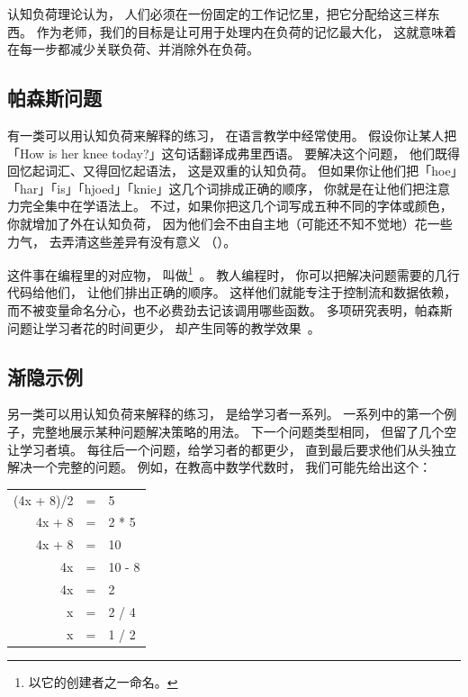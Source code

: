 认知负荷理论认为，
人们必须在一份固定的工作记忆里，把它分配给这三样东西。
作为老师，我们的目标是让可用于处理内在负荷的记忆最大化，
这就意味着在每一步都减少关联负荷、并消除外在负荷。

\subsection*{帕森斯问题}

有一类可以用认知负荷来解释的练习，
在语言教学中经常使用。
假设你让某人把「How is her knee today?」这句话翻译成弗里西语。
要解决这个问题，
他们既得回忆起词汇、又得回忆起语法，
这是双重的认知负荷。
但如果你让他们把「hoe」「har」「is」「hjoed」「knie」这几个词排成正确的顺序，
你就是在让他们把注意力完全集中在学语法上。
不过，如果你把这几个词写成五种不同的字体或颜色，
你就增加了外在认知负荷，
因为他们会不由自主地（可能还不知不觉地）花一些力气，
去弄清这些差异有没有意义
（）。


这件事在编程里的对应物，
叫做\footnote{以它的创建者之一命名。}~\cite{Pars2006}。
教人编程时，
你可以把解决问题需要的几行代码给他们，
让他们排出正确的顺序。
这样他们就能专注于控制流和数据依赖，
而不被变量命名分心，也不必费劲去记该调用哪些函数。
多项研究表明，帕森斯问题让学习者花的时间更少，
却产生同等的教学效果~\cite{Eric2017}。

\subsection*{渐隐示例}

另一类可以用认知负荷来解释的练习，
是给学习者一系列。
一系列中的第一个例子，完整地展示某种问题解决策略的用法。
下一个问题类型相同，
但留了几个空让学习者填。
每往后一个问题，给学习者的都更少，
直到最后要求他们从头独立解决一个完整的问题。
例如，在教高中数学代数时，
我们可能先给出这个：

\begin{center}
\begin{tabular}{rcl}
  (4x + 8)/2	& = &	5	\\
  4x + 8	& = &	2 * 5	\\
  4x + 8	& = &	10	\\
  4x		& = &	10 - 8	\\
  4x		& = &	2	\\
  x		& = &	2 / 4	\\
  x		& = &	1 / 2
\end{tabular}
\end{center}

